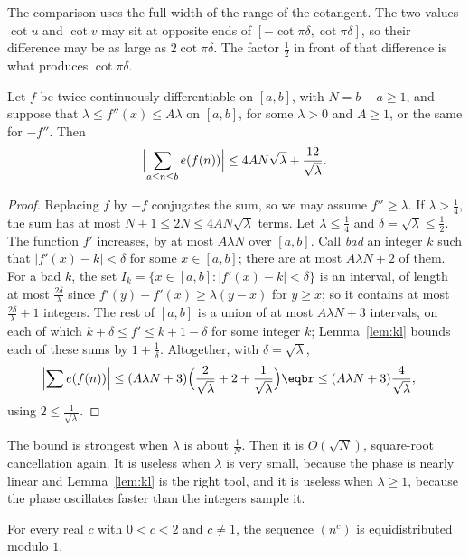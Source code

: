 The comparison uses the full width of the range of the cotangent. The two values $\cot u$ and $\cot v$ may sit at opposite ends of $[-\cot\pi\delta,\cot\pi\delta]$, so their difference may be as large as $2\cot\pi\delta$. The factor $\frac12$ in front of that difference is what produces $\cot\pi\delta$.

\begin{theorem}\label{thm:secondderiv}
Let $f$ be twice continuously differentiable on $[a,b]$, with $N=b-a\ge1$, and suppose that $\lambda\le f''(x)\le A\lambda$ on $[a,b]$, for some $\lambda>0$ and $A\ge1$, or the same for $-f''$. Then
\[
\Bigl|\sum_{a\le n\le b}e(f(n))\Bigr|\le4AN\sqrt\lambda+\frac{12}{\sqrt\lambda}.
\]
\end{theorem}

\begin{proof}
Replacing $f$ by $-f$ conjugates the sum, so we may assume $f''\ge\lambda$. If $\lambda>\frac14$, the sum has at most $N+1\le2N\le4AN\sqrt\lambda$ terms. Let $\lambda\le\frac14$ and $\delta=\sqrt\lambda\le\frac12$. The
function $f'$ increases, by at most $A\lambda N$ over $[a,b]$. Call \emph{bad} an integer $k$ such that $|f'(x)-k|<\delta$ for some $x\in[a,b]$; there are at most $A\lambda N+2$ of them. For a bad $k$, the set
$I_k=\{x\in[a,b]:|f'(x)-k|<\delta\}$ is an interval, of length at most $\frac{2\delta}\lambda$ since $f'(y)-f'(x)\ge\lambda(y-x)$ for $y\ge x$; so it contains at most $\frac{2\delta}\lambda+1$ integers. The rest of $[a,b]$ is a union of at most
$A\lambda N+3$ intervals, on each of which $k+\delta\le f'\le k+1-\delta$ for some integer $k$; Lemma~\ref{lem:kl} bounds each of these sums by $1+\frac1\delta$. Altogether, with $\delta=\sqrt\lambda$,
\[
\begin{aligned}\Bigl|\sum e(f(n))\Bigr|&\le(A\lambda N+3)\Bigl(\frac2{\sqrt\lambda}+2+\frac1{\sqrt\lambda}\Bigr)\eqbr\le(A\lambda N+3)\frac4{\sqrt\lambda},\end{aligned}
\]
using $2\le\frac1{\sqrt\lambda}$.
\end{proof}

The bound is strongest when $\lambda$ is about $\frac1N$. Then it is $O(\sqrt N)$, square-root cancellation again. It is useless when $\lambda$ is very small, because the phase is nearly linear and Lemma~\ref{lem:kl} is the right tool, and it is useless when $\lambda\ge1$, because the phase oscillates faster than the integers sample it.

\begin{theorem}\label{thm:nc}
For every real $c$ with $0<c<2$ and $c\ne1$, the sequence $(n^c)$ is equidistributed modulo $1$.
\end{theorem}


